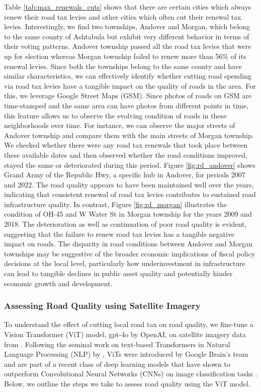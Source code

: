 Table \ref{tab:max_renewals_cuts} shows that there are certain cities which always renew their road tax levies and other cities which often cut their renewal tax levies. Interestingly, we find two townships, Andover and Morgan, which belong to the same county of Ashtabula but exhibit very different behavior in terms of their voting patterns. Andover township passed all the road tax levies that were up for election whereas Morgan township failed to renew more than 56\% of its renewal levies. Since both the townships belong to the same county and have similar characteristics, we can effectively identify whether cutting road spending via road tax levies have a tangible impact on the quality of roads in the area. For this, we leverage Google Street Maps (GSM). Since photos of roads on GSM are time-stamped and the same area can have photos from different points in time, this feature allows us to observe the evolving condition of roads in these neighborhoods over time. For instance, we can observe the major streets of Andover township and compare them with the main streets of Morgan township. We checked whether there were any road tax renewals that took place between these available dates and then observed whether the road conditions improved, stayed the same or deteriorated during this period. Figure \ref{fig:rd_andover} shows Grand Army of the Republic Hwy, a specific hub in Andover, for periods 2007 and 2022. The road quality appears to have been maintained well over the years, indicating that consistent renewal of road tax levies contributes to sustained road infrastructure quality. In contrast, Figure \ref{fig:rd_morgan} illustrates the condition of OH-45 and W Water St in Morgan township for the years 2009 and 2018. The deterioration as well as continuation of poor road quality is evident, suggesting that the failure to renew road tax levies has a tangible negative impact on roads. The disparity in road conditions between Andover and Morgan townships may be suggestive of the broader economic implications of fiscal policy decisions at the local level, particularly how underinvestment in infrastructure can lead to tangible declines in public asset quality and potentially hinder economic growth and development.

\subsubsection{Assessing Road Quality using Satellite Imagery} \label{sec:road_quality}

To understand the effect of cutting local road tax on road quality, we fine-tune a Vision Transformer (ViT) model, gpt-4o by OpenAI, on satellite imagery data from \cite{brewer2021}. Following the seminal work on text-based Transformers in Natural Language Processing (NLP) by \cite{vaswani2017attention}, ViTs were introduced by Google Brain's team and are part of a recent class of deep learning models that have shown to outperform Convolutional Neural Networks (CNNs) on image classification tasks \citep{dosovitskiy2020image}. Below, we outline the steps we take to assess road quality using the ViT model.


